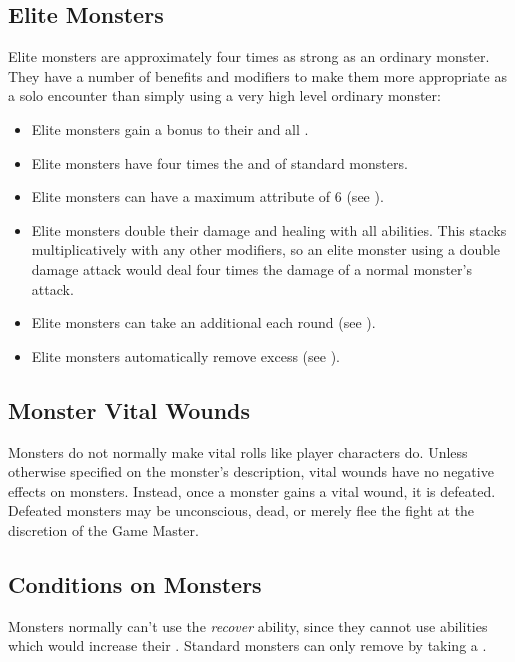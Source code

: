     \subsection{Elite Monsters}\label{Elite Monsters}
        Elite monsters are approximately four times as strong as an ordinary monster.
        They have a number of benefits and modifiers to make them more appropriate as a solo encounter than simply using a very high level ordinary monster:
        \begin{itemize}
            \item Elite monsters gain a  bonus to their  and all .
            \item Elite monsters have four times the  and  of standard monsters.
            \item Elite monsters can have a maximum attribute of 6 (see ).
            \item Elite monsters double their damage and healing with all abilities. This stacks multiplicatively with any other modifiers, so an elite monster using a double damage attack would deal four times the damage of a normal monster's attack.
            \item Elite monsters can take an additional  each round (see ).
            \item Elite monsters automatically remove excess  (see ).
        \end{itemize}

        \subsection{Monster Vital Wounds}
            Monsters do not normally make vital rolls like player characters do.
            Unless otherwise specified on the monster's description, vital wounds have no negative effects on monsters.
            Instead, once a monster gains a vital wound, it is defeated.
            Defeated monsters may be unconscious, dead, or merely flee the fight at the discretion of the Game Master.

        \subsection{Conditions on Monsters}\label{Conditions on Monsters}
            Monsters normally can't use the \textit{recover} ability, since they cannot use abilities which would increase their .
            Standard monsters can only remove  by taking a .

